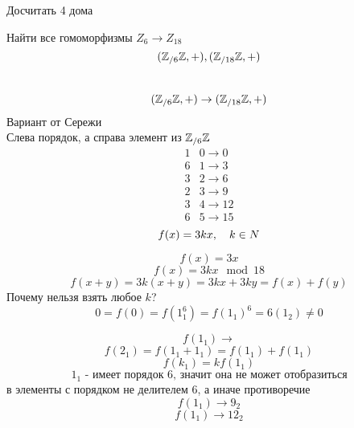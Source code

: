 \documentclass[12pt, fleqn]{article}
\begin{document}
\begin{upr}
    Досчитать 4 дома
\end{upr}

\begin{task}[5]
    Найти все гомоморфизмы $Z_6 \to Z_{18}$
    \[(\mathbb{Z}_{/6}\mathbb{Z}, + ), (\mathbb{Z}_{/18}\mathbb{Z}, +)\]
    \\
    \[(\mathbb{Z}_{/6}\mathbb{Z}, +  ) \to (\mathbb{Z}_{/18}\mathbb{Z}, + )\]
    Вариант от Сережи\\
    Слева порядок, а справа элемент из $\mathbb{Z}_{/6}\mathbb{Z} $
    \[\begin{matrix}
        1 & 0 \to 0\\
        6 & 1 \to 3\\
        3 & 2 \to 6\\
        2 & 3 \to 9\\
        3 & 4 \to 12\\
        6 & 5 \to 15
    \end{matrix}\]
    \[f(x) = 3kx, \quad k \in N\]

    \[f(x) = 3x\]
    \[f(x) = 3kx \mod 18\]
    \[f(x + y) = 3k(x + y) = 3kx + 3ky = f(x) + f(y)\]
    Почему нельзя взять любое $k$?
    \[0 = f(0) = f(1_1^6) = f(1_1)^6 = 6(1_2) \neq 0\]

    \[f(1_1) \to \]
    \[f(2_1) = f(1_1 + 1_1) = f(1_1) + f(1_1)\]
    \[f(k_1) = kf(1_1)\]
    \[1_1 \text{ - имеет порядок 6, значит она не может отобразиться}\]
    в элементы с порядком не делителем 6, а иначе противоречие
    \[f(1_1) \to 9_2\]
    \[f(1_1) \to 12_2\]
\end{task}
\end{document}
